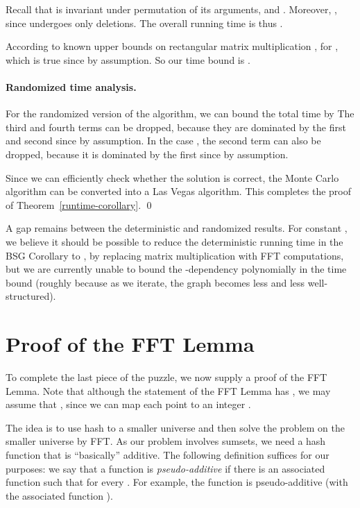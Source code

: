\documentclass[11pt]{article}
\begin{document}
{Recall that  is invariant under
permutation of its arguments, and .  Moreover, ,
since  undergoes only deletions.
The overall running time is
thus .


According to known upper bounds on rectangular matrix multiplication \cite{HuangPan,LeGall1,LeGall2,Vas},
 for
, which is true
since  by assumption.
So our time bound is
.



\paragraph{Randomized time analysis.}

For the randomized version of the algorithm, we can bound
the total time by 
The third and fourth terms can be dropped, because they are
dominated by the first and second since  by assumption.
In the case , the second term can also be dropped,
because it is dominated by the first
since  by assumption.

Since we can efficiently check whether the solution is correct,
the Monte Carlo algorithm can
be converted into a Las Vegas algorithm.
This completes the proof of Theorem~\ref{runtime-corollary}.
\qed


\bigskip
A gap remains between the deterministic and randomized results.
For constant , we believe it should be possible
to reduce the deterministic running time in the BSG Corollary
to , by replacing
matrix multiplication with FFT computations, but we are currently
unable to bound the -dependency polynomially in the time
bound (roughly
because as we
iterate, the graph  becomes less and less well-structured).


\section{Proof of the FFT Lemma}\label{sec-fft}

To complete the last piece of the puzzle, we now supply a proof of the FFT Lemma.
Note that although the statement of the FFT Lemma has ,
we may assume that , since we can map
each point  to an integer
.


The idea is to use hash to a smaller universe and
then solve the problem on the smaller universe by FFT\@.
As our problem involves sumsets,
we need a hash function that is ``basically'' additive.
The following definition suffices for our purposes: we say
that a function  is \emph{pseudo-additive} if there
is an associated function  such that
 for every .
For example, the function  is pseudo-additive
(with the associated function ).

}
\end{document}
